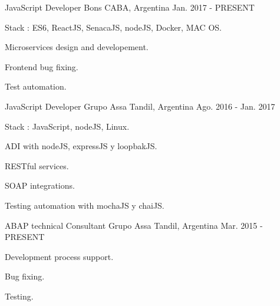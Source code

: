 


\begin{cventries}

\cventry
{ JavaScript Developer} %
{Bons} %
{CABA, Argentina} %
{Jan. 2017 - PRESENT} %
{ %
\begin{cvitems}
\item {Stack : ES6, ReactJS, SenacaJS, nodeJS, Docker, MAC OS.}
\item {Microservices design and developement.}
\item {Frontend bug fixing.}
\item {Test automation.}
\end{cvitems}
}
\cventry
{ JavaScript Developer} %
{Grupo Assa} %
{Tandil, Argentina} %
{Ago. 2016 - Jan. 2017} %
{ %
\begin{cvitems}
\item {Stack : JavaScript, nodeJS, Linux.}
\item {ADI with nodeJS, expressJS y loopbakJS.}
\item {RESTful services.}
\item {SOAP integrations.}
\item {Testing automation with mochaJS y chaiJS.}
\end{cvitems}
}

\cventry
{ABAP technical Consultant} %
{Grupo Assa} %
{Tandil, Argentina} %
{Mar. 2015 - PRESENT} %
{ %
\begin{cvitems}
\item {Development process support.}
\item {Bug fixing.}
\item {Testing.}
\end{cvitems}
}



\end{cventries}
